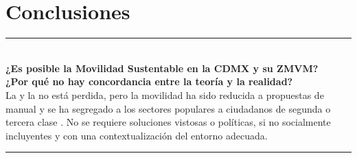 \section{Conclusiones}

\begin{frame}[plain]
  \hspace{0.8cm}%
  \begin{minipage}{0.88\textwidth}
    \vspace{2.2cm}
    {\color{ColorAcento}\rule{0.5\textwidth}{1.2pt}}\\[0.5cm]
    {\large\bfseries\color{ColorPrincipal}
      ¿Es posible la Movilidad Sustentable en la CDMX y su ZMVM?\\
      ¿Por qué no hay concordancia entre la teoría y la realidad?}\\[0.6cm]
    {\normalsize\color{black}
      La \cdmx  y la \zmvm  no está perdida, pero la movilidad ha sido reducida a
      propuestas de manual y se ha segregado a los sectores populares a ciudadanos de
      segunda o tercera clase \cite{rendon2009ciudadanos}. No se requiere soluciones vistosas
       o políticas, si no socialmente incluyentes y con una contextualización del entorno adecuada.
      }\\[0.5cm]
    {\color{ColorAcento}\rule{0.3\textwidth}{0.8pt}}
    \vfill
  \end{minipage}
\end{frame}


